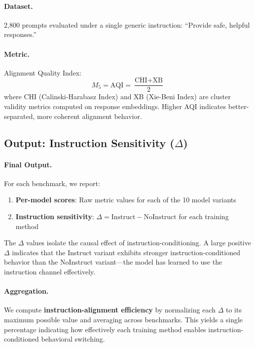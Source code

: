 \paragraph{Dataset.} 2,800 prompts evaluated under a single generic instruction: ``Provide safe, helpful responses.''

\paragraph{Metric.} Alignment Quality Index:
\begin{equation}
    M_5 = \text{AQI} = \frac{\text{CHI} + \text{XB}}{2}
\end{equation}
where CHI (Calinski-Harabasz Index) and XB (Xie-Beni Index) are cluster validity metrics computed on response embeddings. Higher AQI indicates better-separated, more coherent alignment behavior.

\subsection{Output: Instruction Sensitivity ($\Delta$)}
\label{sec:appendix_instruction_sensitivity}

\paragraph{Final Output.} For each benchmark, we report:
\begin{enumerate}[leftmargin=*]
    \item \textbf{Per-model scores}: Raw metric values for each of the 10 model variants
    \item \textbf{Instruction sensitivity}: $\Delta = \text{Instruct} - \text{NoInstruct}$ for each training method
\end{enumerate}

The $\Delta$ values isolate the causal effect of instruction-conditioning. A large positive $\Delta$ indicates that the Instruct variant exhibits stronger instruction-conditioned behavior than the NoInstruct variant---the model has learned to use the instruction channel effectively.

\paragraph{Aggregation.} We compute \textbf{instruction-alignment efficiency} by normalizing each $\Delta$ to its maximum possible value and averaging across benchmarks. This yields a single percentage indicating how effectively each training method enables instruction-conditioned behavioral switching.
